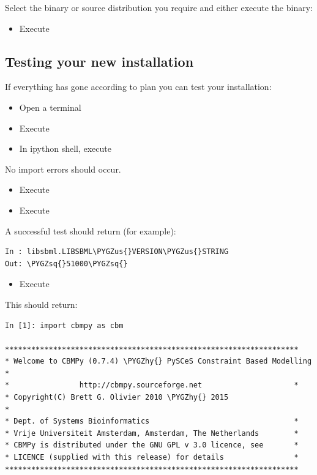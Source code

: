 \documentclass[a4paper,11pt,english]{sphinxmanual}
\def\PYGZus{\char`\_}
\def\PYGZhy{\char`\-}
\def\PYGZsq{\char`\'}
\renewcommand\PYGZsq{\textquotesingle}
\begin{document}
Select the binary or source distribution you require and either execute the binary:
\begin{itemize}
\item {} 
Execute 

\end{itemize}


\subsection{Testing your new installation}
\label{install_doc:testing-your-new-installation}
If everything has gone according to plan you can test your installation:
\begin{itemize}
\item {} 
Open a terminal

\item {} 
Execute 

\item {} 
In ipython shell, execute 

\end{itemize}

No import errors should occur.
\begin{itemize}
\item {} 
Execute 

\item {} 
Execute 

\end{itemize}

A successful test should return (for example):

\begin{Verbatim}[commandchars=\\\{\}]
In : libsbml.LIBSBML\PYGZus{}VERSION\PYGZus{}STRING
Out: \PYGZsq{}51000\PYGZsq{}
\end{Verbatim}
\begin{itemize}
\item {} 
Execute 

\end{itemize}

This should return:

\begin{Verbatim}[commandchars=\\\{\}]
In [1]: import cbmpy as cbm

*******************************************************************
* Welcome to CBMPy (0.7.4) \PYGZhy{} PySCeS Constraint Based Modelling    *
*                http://cbmpy.sourceforge.net                     *
* Copyright(C) Brett G. Olivier 2010 \PYGZhy{} 2015                       *
* Dept. of Systems Bioinformatics                                 *
* Vrije Universiteit Amsterdam, Amsterdam, The Netherlands        *
* CBMPy is distributed under the GNU GPL v 3.0 licence, see       *
* LICENCE (supplied with this release) for details                *
*******************************************************************
\end{Verbatim}
\end{document}
